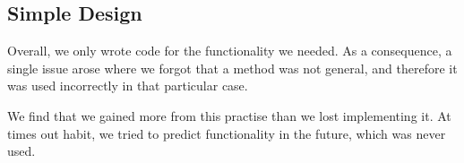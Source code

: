 \subsection{Simple Design}
Overall, we only wrote code for the functionality we needed. As a consequence, a single issue arose where we forgot that a method was not general, and therefore it was used incorrectly in that particular case. 

We find that we gained more from this practise than we lost implementing it. At times out habit, we tried to predict functionality in the future, which was never used.